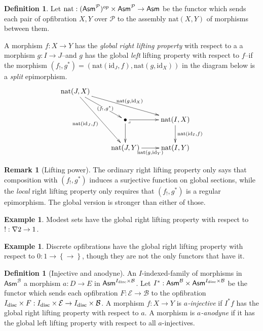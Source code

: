 \documentclass{amsart}
\theoremstyle{plain}
\theoremstyle{definition}
\newtheorem{defin}[theorem]{Definition}
\newtheorem{remark}[theorem]{Remark}
\newtheorem{example}[theorem]{Example}
\newcommand\cat\mathcal
\newcommand\set[1]{\left\{#1\right\}}
\newcommand\id{\mathrm{id}}
\newcommand\ri{^*}
\newcommand\Asm{\mathsf{Asm}}
\begin{document}
\newcommand\pb{\ar@{}[dr]|<\lrcorner}
\newcommand\po{\ar@{}[dr]|>\ulcorner}
\newcommand\nat{\mathrm{nat}}
\begin{defin} Let $\nat:(\Asm^{\cat P})\dual\times \Asm^{\cat P} \to \Asm$ be the functor which sends each pair of opfibration $X,Y$ over $\cat P$ to the assembly $\nat(X,Y)$ of morphisms between them. %

A morphism $f:X\to Y$ has the \emph{global right lifting property} with respect to a a morphism $g:I\to J$--and $g$ has the global \emph{left} lifting property with respect to $f$--if the morphism $(f_!,g\ri) = (\nat(\id_J,f),\nat(g,\id_X))$%
in the diagram below is a \emph{split} epimorphism.
\[\xymatrix{ 
\nat(J,X) \ar[drr]^{\nat(g,\id_X)} \ar[ddr]_{\nat(\id_J,f)} \ar[dr]|(.6){(f_!,g\ri)}\\%
& \bullet \ar[d]\ar[r]\pb & \nat(I,X) \ar[d]^{\nat(\id_I,f)}\\
& \nat(J,Y) \ar[r]_{\nat(g,\id_Y)} & \nat(I,Y)
}\]
\end{defin} 

\begin{remark}[Lifting power] The ordinary right lifting property only says that composition with $(f_!,g\ri)$ induces a surjective function on global sections, while the \emph{local} right lifting property only requires that $(f_!,g\ri)$ is a regular epimorphism. The global version is stronger than either of those. \label{liftingpower} \end{remark}

\begin{example} Modest sets have the global right lifting property with respect to $!:\nabla 2\to 1$. \end{example}

\begin{example} Discrete opfibrations have the global right lifting property with respect to $0:1\to \set\to$, though they are not the only functors that have it. \end{example}

\begin{defin}[Injective and anodyne] %
An $I$-indexed-family of morphisms in $\Asm^{\cat B}$ a morphism $a:D\to E$ in $\Asm^{I\disc\times\cat B}$. Let $I\ri:\Asm^{\cat B}\times \Asm^{I\disc\times \cat B}$ be the functor which sends each opfibration $F:\cat E\to \cat B$ to the opfibration $I\disc\times F:I\disc\times\cat E\to I\disc\times\cat B$. A morphism $f:X\to Y$ is \emph{$a$-injective} if $I\ri f$ has the global right lifting property with respect to $a$. A morphism is \emph{$a$-anodyne} if it has the global left lifting property with respect to all $a$-injectives. \end{defin}
\end{document}
